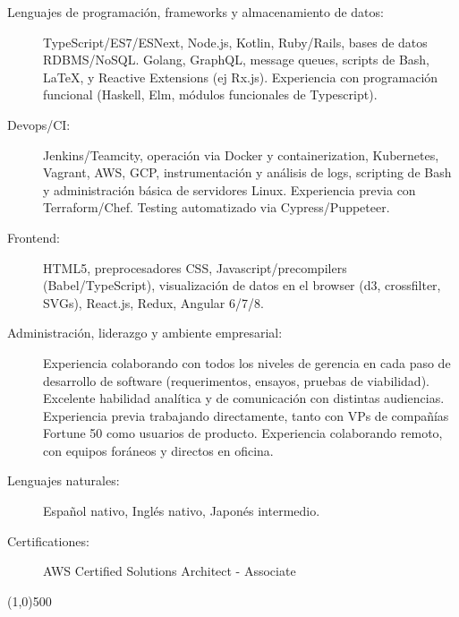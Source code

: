\documentclass[letterpaper,11pt]{article}
\newcommand{\addline}{\line(1,0){500}}
\begin{document}
\begin{description}
	\item[Lenguajes de programación, frameworks y almacenamiento de datos:]
    TypeScript/ES7/ESNext, Node.js, Kotlin, Ruby/Rails, bases de datos RDBMS/NoSQL. Golang, GraphQL, message queues, scripts de Bash, \LaTeX, y Reactive Extensions (ej Rx.js). Experiencia con programación funcional (Haskell, Elm, módulos funcionales de Typescript).

	\item [Devops/CI:]
    Jenkins/Teamcity, operación via Docker y containerization, Kubernetes, Vagrant, AWS, GCP, instrumentación y análisis de logs, scripting de Bash y administración básica de servidores Linux. Experiencia previa con Terraform/Chef. Testing automatizado via Cypress/Puppeteer.

  \item [Frontend:]
    HTML5, preprocesadores CSS, Javascript/precompilers (Babel/TypeScript), visualización de datos en el browser (d3, crossfilter, SVGs), React.js, Redux, Angular 6/7/8.

	\item[Administración, liderazgo y ambiente empresarial:]
    Experiencia colaborando con todos los niveles de gerencia en cada paso de desarrollo de software (requerimentos, ensayos, pruebas de viabilidad). Excelente habilidad analítica y  de comunicación con distintas audiencias. Experiencia previa trabajando directamente, tanto con VPs de compañías Fortune 50 como usuarios de producto. Experiencia colaborando remoto, con equipos foráneos y directos en oficina.

	\item[Lenguajes naturales:]
		Español nativo, Inglés nativo, Japonés intermedio. 

	\item[Certificationes:]
		AWS Certified Solutions Architect - Associate

\end{description}
\addline
\end{document}
